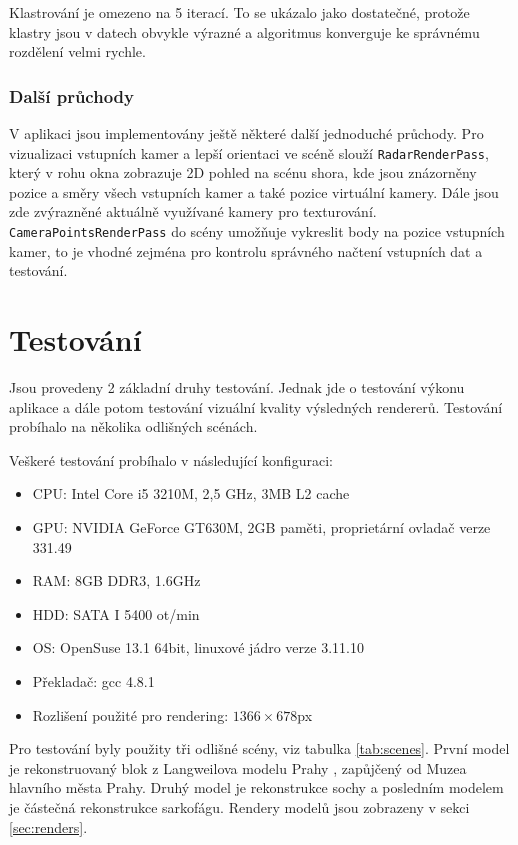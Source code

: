 \documentclass[11pt,twoside,a4paper]{book}
\begin{document}
Klastrování je omezeno na 5 iterací. To se ukázalo jako dostatečné, protože klastry jsou v datech obvykle výrazné a algoritmus konverguje ke správnému rozdělení velmi rychle.

\subsection{Další průchody}

V aplikaci jsou implementovány ještě některé další jednoduché průchody. Pro vizualizaci vstupních kamer a lepší orientaci ve scéně slouží \texttt{RadarRenderPass}, který v rohu okna zobrazuje 2D pohled na scénu shora, kde jsou znázorněny pozice a směry všech vstupních kamer a také pozice virtuální kamery. Dále jsou zde zvýrazněné aktuálně využívané kamery pro texturování. \texttt{CameraPointsRenderPass} do scény umožňuje vykreslit body na pozice vstupních kamer, to je vhodné zejména pro kontrolu správného načtení vstupních dat a testování.

\chapter{Testování}
\label{chap:testing}

Jsou provedeny 2 základní druhy testování. Jednak jde o testování výkonu aplikace a dále potom testování vizuální kvality výsledných rendererů. Testování probíhalo na několika odlišných scénách.

Veškeré testování probíhalo v následující konfiguraci:
\begin{itemize}
\item CPU:  Intel Core i5 3210M,  2,5 GHz, 3MB L2 cache
\item GPU:  NVIDIA GeForce GT630M, 2GB paměti, proprietární ovladač verze 331.49
\item RAM: 8GB  DDR3, 1.6GHz
\item HDD: SATA I 5400 ot/min
\item OS: OpenSuse 13.1 64bit, linuxové jádro verze 3.11.10
\item Překladač: gcc 4.8.1
\item Rozlišení použité pro rendering: $1366\times678$px
\end{itemize}

Pro testování byly použity tři odlišné scény, viz tabulka \ref{tab:scenes}. První model je rekonstruovaný blok z Langweilova modelu Prahy \cite{langweil}, zapůjčený od Muzea hlavního města Prahy.  Druhý model je rekonstrukce sochy a posledním modelem je částečná rekonstrukce sarkofágu. Rendery modelů jsou zobrazeny v sekci  \ref{sec:renders}.
\end{document}
